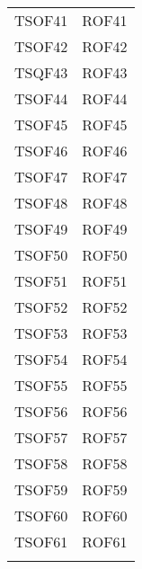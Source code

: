 \documentclass[../PianoDiQualifica_v3.0.0.tex]{subfiles}
\begin{document}
\begin{longtable}[c] { >{\centering\arraybackslash}p{3cm} >{\centering\arraybackslash}p{3cm}}
			\addlinespace[0.3em]
			\midrule
			\addlinespace[0.3em]
			TSOF41 & ROF41 \\
			\addlinespace[0.3em]
			\midrule
			\addlinespace[0.3em]
			TSOF42 & ROF42 \\
			\addlinespace[0.3em]
			\midrule
			\addlinespace[0.3em]
			TSQF43 & ROF43 \\
			\addlinespace[0.3em]
			\midrule
			\addlinespace[0.3em]
			TSOF44 & ROF44 \\
			\addlinespace[0.3em]
			\midrule
			\addlinespace[0.3em]
			TSOF45 & ROF45 \\
			\addlinespace[0.3em]
			\midrule
			\addlinespace[0.3em]
			TSOF46 & ROF46 \\
			\addlinespace[0.3em]
			\midrule
			\addlinespace[0.3em]
			TSOF47 & ROF47 \\
			\addlinespace[0.3em]
			\midrule
			\addlinespace[0.3em]
			TSOF48 & ROF48 \\
			\addlinespace[0.3em]
			\midrule
			\addlinespace[0.3em]
			TSOF49 & ROF49 \\
			\addlinespace[0.3em]
			\midrule
			\addlinespace[0.3em]
			TSOF50 & ROF50 \\
			\addlinespace[0.3em]
			\midrule
			\addlinespace[0.3em]
			TSOF51 & ROF51 \\
			\addlinespace[0.3em]
			\midrule
			\addlinespace[0.3em]
			TSOF52 & ROF52 \\
			\addlinespace[0.3em]
			\midrule
			\addlinespace[0.3em]
			TSOF53 & ROF53 \\
			\addlinespace[0.3em]
			\midrule
			\addlinespace[0.3em]
			TSOF54 & ROF54 \\
			\addlinespace[0.3em]
			\midrule
			\addlinespace[0.3em]
			TSOF55 & ROF55 \\
			\addlinespace[0.3em]
			\midrule
			\addlinespace[0.3em]
			TSOF56 & ROF56 \\
			\addlinespace[0.3em]
			\midrule
			\addlinespace[0.3em]
			TSOF57 & ROF57 \\
			\addlinespace[0.3em]
			\midrule
			\addlinespace[0.3em]
			TSOF58 & ROF58 \\
			\addlinespace[0.3em]
			\midrule
			\addlinespace[0.3em]
			TSOF59 & ROF59 \\
			\addlinespace[0.3em]
			\midrule
			\addlinespace[0.3em]
			TSOF60 & ROF60 \\
			\addlinespace[0.3em]
			\midrule
			\addlinespace[0.3em]
			TSOF61 & ROF61 \\
			\addlinespace[0.3em]
			\midrule
			\addlinespace[0.3em]

\end{longtable}
\end{document}

